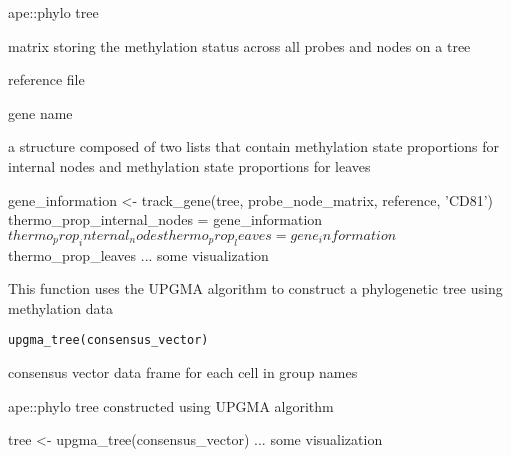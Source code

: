 \documentclass[a4paper]{book}
\begin{document}
%
\begin{Arguments}
\begin{ldescription}
\item[\code{tree}] ape::phylo tree

\item[\code{probe\_node\_matrix}] matrix storing the methylation status across all
probes and nodes on a tree

\item[\code{reference}] reference file

\item[\code{gene}] gene name
\end{ldescription}
\end{Arguments}
%
\begin{Value}
a structure composed of two lists that contain methylation state 
proportions for internal nodes and methylation state proportions for leaves
\end{Value}
%
\begin{Examples}
\begin{ExampleCode}
gene_information <- track_gene(tree, probe_node_matrix, reference, 'CD81')
thermo_prop_internal_nodes = gene_information$thermo_prop_internal_nodes
thermo_prop_leaves = gene_information$thermo_prop_leaves
... some visualization 
\end{ExampleCode}
\end{Examples}
%
\begin{Description}\relax
This function uses the UPGMA algorithm to construct a phylogenetic tree 
using methylation data
\end{Description}
%
\begin{Usage}
\begin{verbatim}
upgma_tree(consensus_vector)
\end{verbatim}
\end{Usage}
%
\begin{Arguments}
\begin{ldescription}
\item[\code{consensus\_vector}] consensus vector data frame for each cell in group 
names
\end{ldescription}
\end{Arguments}
%
\begin{Value}
ape::phylo tree constructed using UPGMA algorithm
\end{Value}
%
\begin{Examples}
\begin{ExampleCode}
tree <- upgma_tree(consensus_vector)
... some visualization 
\end{ExampleCode}
\end{Examples}
\end{document}
